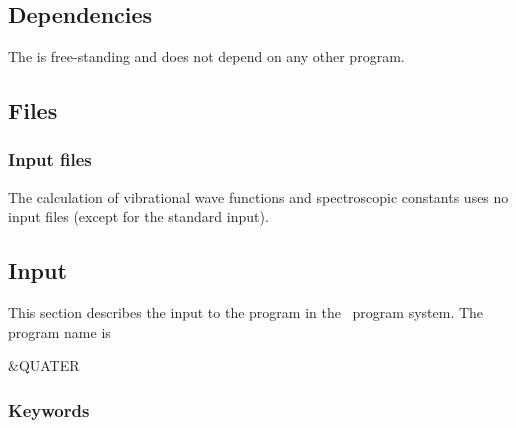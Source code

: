 
\section{}
\label{UG:sec:quater}

\subsection{Dependencies}
\label{UG:sec:quater_dependencies}
The  is free-standing and does not depend on any
other program.

\subsection{Files}
\label{UG:sec:quater_files}
\subsubsection{Input files}

The calculation of vibrational wave functions and spectroscopic
constants uses no input files (except for the standard input).

\subsection{Input}
\label{UG:sec:quater_input}
This section describes the input to the  program in the
\molcas\ program system. The program name is
\begin{inputlisting}
 &QUATER
\end{inputlisting}

\subsubsection{Keywords}


